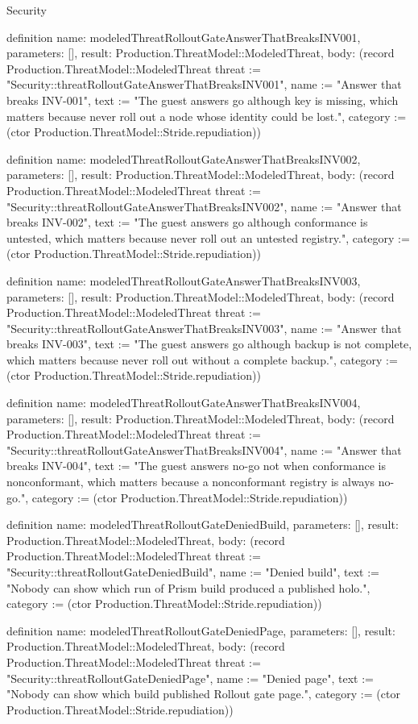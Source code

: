 \begin{lexlean}{Security}
\begin{semanticmodule}
definition{
  name: modeledThreatRolloutGateAnswerThatBreaksINV001,
  parameters: [],
  result: Production.ThreatModel::ModeledThreat,
  body: (record Production.ThreatModel::ModeledThreat {threat := "Security::threatRolloutGateAnswerThatBreaksINV001", name := "Answer that breaks INV-001", text := "The guest answers go although key is missing, which matters because never roll out a node whose identity could be lost.", category := (ctor Production.ThreatModel::Stride.repudiation)})
}

definition{
  name: modeledThreatRolloutGateAnswerThatBreaksINV002,
  parameters: [],
  result: Production.ThreatModel::ModeledThreat,
  body: (record Production.ThreatModel::ModeledThreat {threat := "Security::threatRolloutGateAnswerThatBreaksINV002", name := "Answer that breaks INV-002", text := "The guest answers go although conformance is untested, which matters because never roll out an untested registry.", category := (ctor Production.ThreatModel::Stride.repudiation)})
}

definition{
  name: modeledThreatRolloutGateAnswerThatBreaksINV003,
  parameters: [],
  result: Production.ThreatModel::ModeledThreat,
  body: (record Production.ThreatModel::ModeledThreat {threat := "Security::threatRolloutGateAnswerThatBreaksINV003", name := "Answer that breaks INV-003", text := "The guest answers go although backup is not complete, which matters because never roll out without a complete backup.", category := (ctor Production.ThreatModel::Stride.repudiation)})
}

definition{
  name: modeledThreatRolloutGateAnswerThatBreaksINV004,
  parameters: [],
  result: Production.ThreatModel::ModeledThreat,
  body: (record Production.ThreatModel::ModeledThreat {threat := "Security::threatRolloutGateAnswerThatBreaksINV004", name := "Answer that breaks INV-004", text := "The guest answers no-go not when conformance is nonconformant, which matters because a nonconformant registry is always no-go.", category := (ctor Production.ThreatModel::Stride.repudiation)})
}

definition{
  name: modeledThreatRolloutGateDeniedBuild,
  parameters: [],
  result: Production.ThreatModel::ModeledThreat,
  body: (record Production.ThreatModel::ModeledThreat {threat := "Security::threatRolloutGateDeniedBuild", name := "Denied build", text := "Nobody can show which run of Prism build produced a published holo.", category := (ctor Production.ThreatModel::Stride.repudiation)})
}

definition{
  name: modeledThreatRolloutGateDeniedPage,
  parameters: [],
  result: Production.ThreatModel::ModeledThreat,
  body: (record Production.ThreatModel::ModeledThreat {threat := "Security::threatRolloutGateDeniedPage", name := "Denied page", text := "Nobody can show which build published Rollout gate page.", category := (ctor Production.ThreatModel::Stride.repudiation)})
}


\end{semanticmodule}
\end{lexlean}
